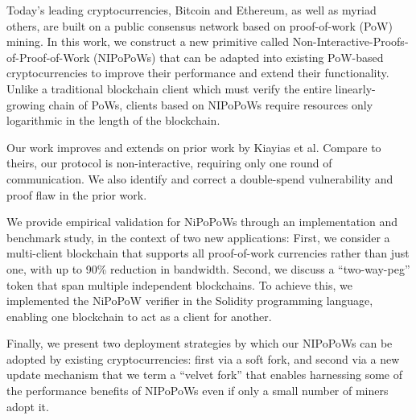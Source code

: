 Today's leading cryptocurrencies, Bitcoin and Ethereum, as well as myriad others, are built on a public consensus network based on proof-of-work (PoW) mining. In this work, we construct a new primitive called Non-Interactive-Proofs-of-Proof-of-Work (NIPoPoWs) that can be adapted into existing PoW-based cryptocurrencies to improve their performance and extend their functionality.
Unlike a traditional blockchain client
which must verify the entire linearly-growing chain of PoWs, clients based on
NIPoPoWs require resources only logarithmic in the length of the blockchain.

Our work improves and extends on prior work by Kiayias et al. Compare to theirs, our protocol is non-interactive, requiring only one round of communication. We also identify and correct a double-spend vulnerability and proof flaw in the prior work. %

We provide empirical validation for NiPoPoWs through an implementation and benchmark study, in the context of two new applications:
First, we consider a multi-client blockchain that supports all proof-of-work currencies rather than just one, with up to 90\% reduction in bandwidth. %
Second, we discuss a ``two-way-peg'' token that span multiple independent blockchains. To achieve this, we implemented the NiPoPoW verifier in the Solidity programming language, enabling one blockchain to act as a client for another.

 Finally, we present two deployment strategies by which our NIPoPoWs can be adopted by existing cryptocurrencies: first via a soft fork, and second via a new update mechanism that we
term a ``velvet fork'' that enables harnessing some of the performance benefits
of NIPoPoWs even if only a small number of miners adopt it.
